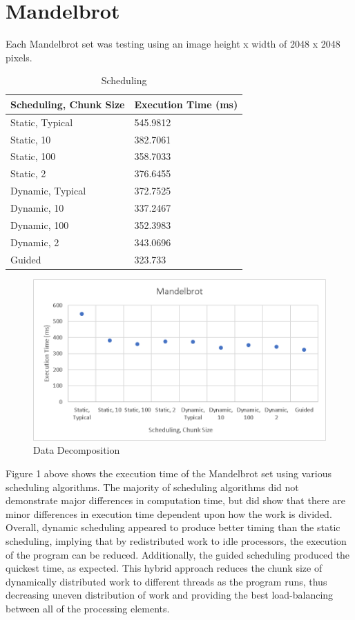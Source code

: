 \documentclass[12pt, letterpaper]{report}
\begin{document}
\section{Mandelbrot}

Each Mandelbrot set was testing using an image height x width of 2048 x 2048 pixels.

\begin{table}[H]
	\centering
	\begin{tabular}{ |l|l| }
		\hline
		\textbf{Scheduling, Chunk Size} & \textbf{Execution Time (ms)} \\
		\hline
		Static, Typical &  545.9812 \\
		\hline
		Static, 10 & 382.7061 \\
		\hline
		Static, 100 & 358.7033 \\
		\hline
		Static, 2 & 376.6455 \\
		\hline
		Dynamic, Typical & 372.7525 \\
		\hline
		Dynamic, 10 & 337.2467 \\
		\hline
		Dynamic, 100 & 352.3983 \\
		\hline
		Dynamic, 2 & 343.0696 \\
		\hline
		Guided & 323.733 \\
		\hline
	\end{tabular}
	\caption{Scheduling}
\end{table}


\begin{figure}[H]
	\centering
	\includegraphics[width=0.7\columnwidth]{mandelbrot.png}
	\caption{Data Decomposition}
\end{figure}

Figure 1 above shows the execution time of the Mandelbrot set using various scheduling algorithms. The majority of scheduling algorithms did not demonstrate major differences in computation time, but did show that there are minor differences in execution time dependent upon how the work is divided. Overall, dynamic scheduling appeared to produce better timing than the static scheduling, implying that by redistributed work to idle processors, the execution of the program can be reduced. Additionally, the guided scheduling produced the quickest time, as expected. This hybrid approach reduces the chunk size of dynamically distributed work to different threads as the program runs, thus decreasing uneven distribution of work and providing the best load-balancing between all of the processing elements.
\end{document}
